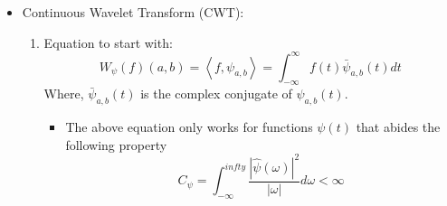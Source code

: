 \documentclass[11.5pt,a4paper]{article}
\begin{document}
\begin{itemize}
\begin{enumerate}
\begin{equation*}
\begin{cases}
                0 & \text{otherwise }
            \end{cases}
        \end{equation*}
        By choosing each higher frequency layer as a bisection of the lower layers, the \textbf{Haar} wavelets are orthogonal (thus they are a great basis for a signal).
        \item \textbf{Summary:} Wavelets are like \hl{mathematical microscopes} that are used to analyze signals at different scales. They can capture local transient features such as edges, spikes, or sudden changes. Methods like DWT (Discrete Wavelet Transform), which uses the multi-resolution decomposition, and CWT (Continuous Wavelet Transform), which uses the mult-resolution decomposition to a lesser extent, use the wavelets in conjunction with multi-resolution decomposition to reveal the time-frequency characteristics.
        \begin{itemize}
            \item \textit{Think of STFT as a fixed magnifying glass - you see everything with the same “zoom level,” which limits your ability to resolve very fast or very slow changes well.} 
            \item \textit{Wavelet Transform, on the other hand, is like a variable zoom magnifying glass -  you zoom in tightly on fast events (good time resolution) and zoom out to see slow trends clearly (good frequency resolution).}
        \end{itemize}
    \end{enumerate}
    \item Continuous Wavelet Transform (CWT):
    \begin{enumerate}
        \item Equation to start with:
        \begin{equation*}
            W_{\psi}(f)(a,b) = \left< f, \psi_{a,b} \right> = \int_{-\infty}^{\infty}f(t)\bar{\psi}_{a,b}(t)dt
        \end{equation*}
        Where, $\bar{\psi}_{a,b}(t)$ is the complex conjugate of $\psi_{a,b}(t)$.
        \begin{itemize}
            \item The above equation only works for functions $\psi(t)$ that abides the following property
            \begin{equation*}
                C_{\psi} = \int_{-\infty}^{infty} \frac{|\hat{\psi}(\omega)|^2}{|\omega|}d\omega < \infty
            \end{equation*}

\end{itemize}
\end{enumerate}
\end{itemize}
\end{document}
